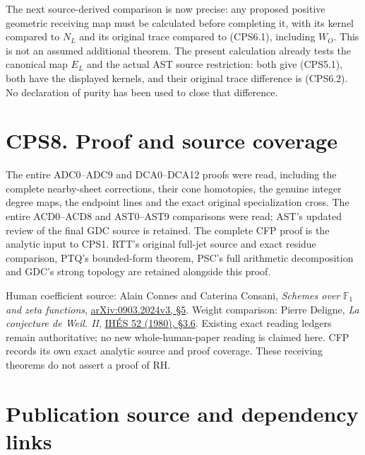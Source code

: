 The next source-derived comparison is now precise: any proposed positive
geometric receiving map must be calculated before completing it, with
its kernel compared to \(N_L\) and its original trace compared to
(CPS6.1), including \(W_O\). This is not an assumed additional theorem.
The present calculation already tests the canonical map \(E_L\) and the
actual AST source restriction: both give (CPS5.1), both have the
displayed kernels, and their original trace difference is (CPS6.2). No
declaration of purity has been used to close that difference.

\section{CPS8. Proof and source
coverage}\label{cps8.-proof-and-source-coverage}

The entire ADC0--ADC9 and DCA0--DCA12 proofs were read, including the
complete nearby-sheet corrections, their cone homotopies, the genuine
integer degree maps, the endpoint lines and the exact original
specialization cross. The entire ACD0--ACD8 and AST0--AST9 comparisons
were read; AST's updated review of the final GDC source is retained. The
complete CFP proof is the analytic input to CPS1. RTT's original
full-jet source and exact residue comparison, PTQ's bounded-form
theorem, PSC's full arithmetic decomposition and GDC's strong topology
are retained alongside this proof.

Human coefficient source: Alain Connes and Caterina Consani,
\emph{Schemes over} \(\mathbb F_1\) \emph{and zeta functions},
\href{https://arxiv.org/abs/0903.2024v3}{arXiv:0903.2024v3, §5}. Weight
comparison: Pierre Deligne, \emph{La conjecture de Weil. II},
\href{https://numdam.org/item/PMIHES_1980__52__137_0/}{IHÉS 52 (1980),
§3.6}. Existing exact reading ledgers remain authoritative; no new
whole-human-paper reading is claimed here. CFP records its own exact
analytic source and proof coverage. These receiving theorems do not
assert a proof of RH.

\section{Publication source and dependency
links}\label{publication-source-and-dependency-links-5}

